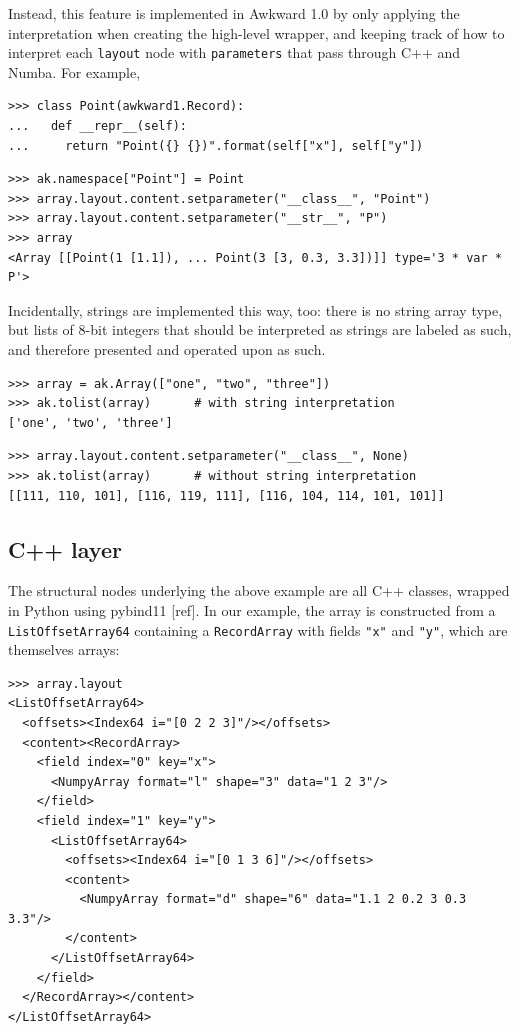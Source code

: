 \documentclass{webofc}
\begin{document}
Instead, this feature is implemented in Awkward 1.0 by only applying the interpretation when creating the high-level wrapper, and keeping track of how to interpret each \texttt{layout} node with \texttt{parameters} that pass through C++ and Numba. For example,

\begin{verbatim}
>>> class Point(awkward1.Record):
...   def __repr__(self):
...     return "Point({} {})".format(self["x"], self["y"])
\end{verbatim}

\begin{verbatim}
>>> ak.namespace["Point"] = Point
>>> array.layout.content.setparameter("__class__", "Point")
>>> array.layout.content.setparameter("__str__", "P")
>>> array
<Array [[Point(1 [1.1]), ... Point(3 [3, 0.3, 3.3])]] type='3 * var * P'>
\end{verbatim}

\noindent Incidentally, strings are implemented this way, too: there is no string array type, but lists of 8-bit integers that should be interpreted as strings are labeled as such, and therefore presented and operated upon as such.

\begin{verbatim}
>>> array = ak.Array(["one", "two", "three"])
>>> ak.tolist(array)      # with string interpretation
['one', 'two', 'three']
\end{verbatim}

\begin{verbatim}
>>> array.layout.content.setparameter("__class__", None)
>>> ak.tolist(array)      # without string interpretation
[[111, 110, 101], [116, 119, 111], [116, 104, 114, 101, 101]]
\end{verbatim}

\subsection{C++ layer}

The structural nodes underlying the above example are all C++ classes, wrapped in Python using pybind11 [ref]. In our example, the array is constructed from a \texttt{ListOffsetArray64} containing a \texttt{RecordArray} with fields \texttt{"x"} and \texttt{"y"}, which are themselves arrays:

\begin{verbatim}
>>> array.layout
<ListOffsetArray64>
  <offsets><Index64 i="[0 2 2 3]"/></offsets>
  <content><RecordArray>
    <field index="0" key="x">
      <NumpyArray format="l" shape="3" data="1 2 3"/>
    </field>
    <field index="1" key="y">
      <ListOffsetArray64>
        <offsets><Index64 i="[0 1 3 6]"/></offsets>
        <content>
          <NumpyArray format="d" shape="6" data="1.1 2 0.2 3 0.3 3.3"/>
        </content>
      </ListOffsetArray64>
    </field>
  </RecordArray></content>
</ListOffsetArray64>
\end{verbatim}
\end{document}
